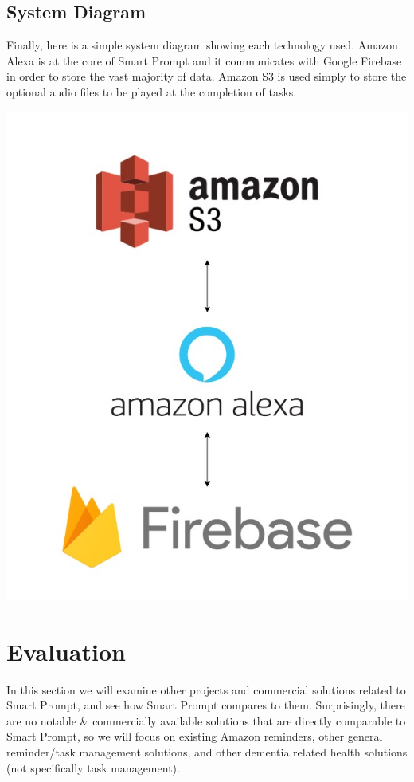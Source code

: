 \documentclass[11pt, oneside]{article}
\begin{document}
\subsection{System Diagram}

Finally, here is a simple system diagram showing each technology used. 
Amazon Alexa is at the core of Smart Prompt and it communicates with Google Firebase in order to store the vast majority of data. 
Amazon S3 is used simply to store the optional audio files to be played at the completion of tasks. 
\begin{center}
  \includegraphics[width=\linewidth * 2/3]{images/systemDiagram.jpg}
\end{center}


\section{Evaluation}

In this section we will examine other projects and commercial solutions related to Smart Prompt, and see how Smart Prompt compares to them. 
Surprisingly, there are no notable \& commercially available solutions that are directly comparable to Smart Prompt, so we will focus on existing Amazon reminders, other general reminder/task management solutions, and other dementia related health solutions (not specifically task management). 
\end{document}
